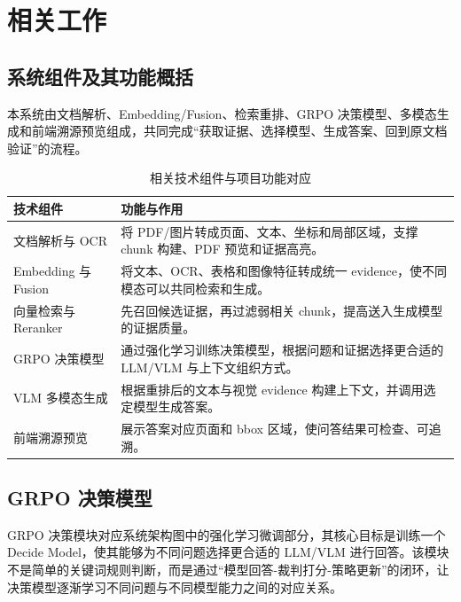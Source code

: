 \chapter{相关工作}

\section{系统组件及其功能概括}

本系统由文档解析、Embedding/Fusion、检索重排、GRPO 决策模型、多模态生成和前端溯源预览组成，共同完成“获取证据、选择模型、生成答案、回到原文档验证”的流程。

\begin{table}[htbp]
  \centering
  \caption{相关技术组件与项目功能对应}
  \label{tab:component_function}
  \footnotesize
  \setlength{\tabcolsep}{4pt}
  \renewcommand{\arraystretch}{1.12}
  \begin{tabularx}{\textwidth}{>{\raggedright\arraybackslash}p{}>{\raggedright\arraybackslash}X}
    \toprule
    技术组件 & 功能与作用 \\
    \midrule
    文档解析与 OCR & 将 PDF/图片转成页面、文本、坐标和局部区域，支撑 chunk 构建、PDF 预览和证据高亮。\\
    Embedding 与 Fusion & 将文本、OCR、表格和图像特征转成统一 evidence，使不同模态可以共同检索和生成。\\
    向量检索与 Reranker & 先召回候选证据，再过滤弱相关 chunk，提高送入生成模型的证据质量。\\
    GRPO 决策模型 & 通过强化学习训练决策模型，根据问题和证据选择更合适的 LLM/VLM 与上下文组织方式。\\
    VLM 多模态生成 & 根据重排后的文本与视觉 evidence 构建上下文，并调用选定模型生成答案。\\
    前端溯源预览 & 展示答案对应页面和 bbox 区域，使问答结果可检查、可追溯。\\
    \bottomrule
  \end{tabularx}
\end{table}

\section{GRPO 决策模型}

GRPO 决策模块对应系统架构图中的强化学习微调部分，其核心目标是训练一个 Decide Model，使其能够为不同问题选择更合适的 LLM/VLM 进行回答。该模块不是简单的关键词规则判断，而是通过“模型回答-裁判打分-策略更新”的闭环，让决策模型逐渐学习不同问题与不同模型能力之间的对应关系。

